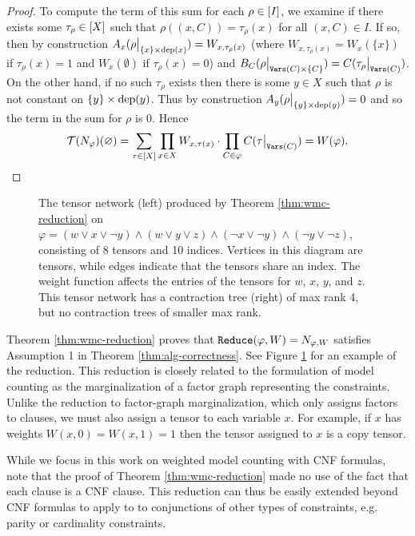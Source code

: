 \begin{proof}
To compute the term of this sum for each $\rho \in [I]$, we examine if there exists some $\tau_\rho \in [X]$ such that $\rho((x, C)) = \tau_\rho(x)$ for all $(x, C) \in I$. If so, then by construction $A_x(\rho\big|_{\{x\} \times \text{dep}(x)}) = W_{x, \tau_\rho(x)}$ (where $W_{x, \tau_\rho(x)} = W_x(\{x\})$ if $\tau_\rho(x)=1$ and $W_x(\emptyset)$ if $\tau_\rho(x)=0$) and $B_C(\rho\big|_{\texttt{\upshape Vars}(C) \times \{C\}}) = C(\tau_\rho\big|_{\texttt{\upshape Vars}(C)})$. On the other hand, if no such $\tau_\rho$ exists then there is some $y \in X$ such that $\rho$ is not constant on $\{y\} \times \text{dep}(y)$. Thus by construction $A_y(\rho\big|_{\{y\} \times \text{dep}(y)}) = 0$ and so the term in the sum for $\rho$ is 0. Hence
$$\mathcal{T}(N_\varphi)(\varnothing) = \sum_{\tau \in [X]} \prod_{x \in X} W_{x, \tau(x)} \cdot \prod_{C \in \varphi} C(\tau\big|_{\texttt{\upshape Vars}(C)}) = W(\varphi).$$
\end{proof}

\begin{figure}[t]
	\centering
	
	\hspace{1cm}
	
	\caption{\label{fig:wmc-example} The tensor network (left) produced by Theorem \ref{thm:wmc-reduction} on $\varphi = (w \lor x \lor \neg y) \land (w \lor y \lor z) \land (\neg x \lor \neg y) \land (\neg y \lor \neg z)$, consisting of 8 tensors and 10 indices. Vertices in this diagram are tensors, while edges indicate that the tensors share an index. The weight function affects the entries of the tensors for $w$, $x$, $y$, and $z$. This tensor network has a contraction tree (right) of max rank 4, but no contraction trees of smaller max rank.}
\end{figure}

Theorem \ref{thm:wmc-reduction} proves that $\texttt{\upshape Reduce}(\varphi,W) = N_{\varphi, W}$ satisfies Assumption 1 in Theorem \ref{thm:alg-correctness}. See Figure \ref{fig:wmc-example} for an example of the reduction. 
This reduction is closely related to the formulation of model counting as the marginalization of a factor graph representing the constraints. 
Unlike the reduction to factor-graph marginalization, which only assigns factors to clauses, we must also assign a tensor to each variable $x$. 
For example, if $x$ has weights $W(x, 0) = W(x,1) = 1$ then the tensor assigned to $x$ is a copy tensor.

While we focus in this work on weighted model counting with CNF formulas, note that the proof of Theorem \ref{thm:wmc-reduction} made no use of the fact that each clause is a CNF clause.
This reduction can thus be easily extended beyond CNF formulas to apply to to conjunctions of other types of constraints, e.g. parity or cardinality constraints.
